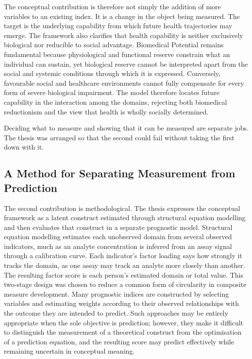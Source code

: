 The conceptual contribution is therefore not simply the addition of more variables to an existing index. It is a change in the object being measured. The target is the underlying capability from which future health trajectories may emerge. The framework also clarifies that health capability is neither exclusively biological nor reducible to social advantage. Biomedical Potential remains fundamental because physiological and functional reserve constrain what an individual can sustain, yet biological reserve cannot be interpreted apart from the social and systemic conditions through which it is expressed. Conversely, favourable social and healthcare environments cannot fully compensate for every form of severe biological impairment. The model therefore locates future capability in the interaction among the domains, rejecting both biomedical reductionism and the view that health is wholly socially determined.

Deciding what to measure and showing that it can be measured are separate
jobs. The thesis was arranged so that the second could fail without taking the
first down with it.

\subsection{A Method for Separating Measurement from Prediction}

The second contribution is methodological. The thesis expresses the conceptual framework as a latent construct estimated through structural equation modelling and then evaluates that construct in a separate prognostic model. Structural equation modelling estimates each unobserved domain from several observed indicators, much as an analyte concentration is inferred from an assay signal through a calibration curve. Each indicator's factor loading says how strongly it tracks the domain, as one assay may track an analyte more closely than another. The resulting factor score is each person's estimated domain or total value. This two-stage design was chosen to reduce a common form of circularity in composite measure development. Many prognostic indices are constructed by selecting variables and estimating weights according to their observed relationships with the outcome they are intended to predict. Such approaches may be entirely appropriate when the sole objective is prediction; however, they make it difficult to distinguish the measurement of a theoretical construct from the optimisation of a prediction equation, and the resulting score may predict effectively while remaining uncertain in conceptual meaning.

